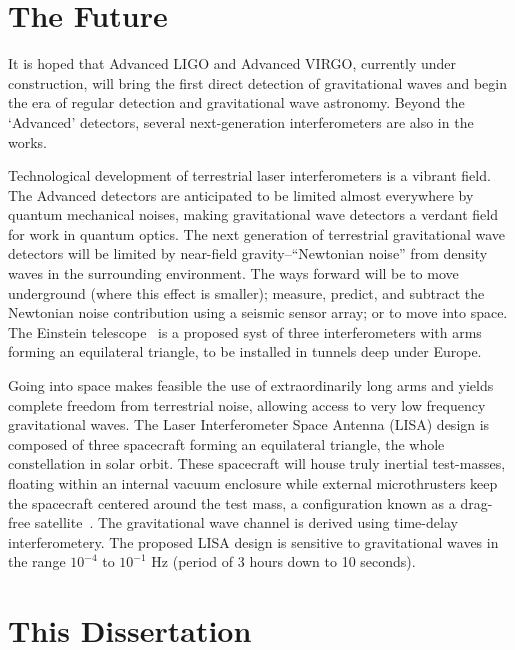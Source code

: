 \section{The Future}

It is hoped that Advanced LIGO and Advanced VIRGO, currently under
construction, will bring the first direct detection of gravitational
waves and begin the era of regular detection and gravitational wave
astronomy.
%
Beyond the `Advanced' detectors, several next-generation
interferometers are also in the works.

Technological development of terrestrial laser
interferometers is a vibrant field.  The Advanced detectors are
anticipated to be limited almost everywhere by quantum mechanical
noises, making gravitational wave detectors a verdant field for work
in quantum optics.  The next generation of terrestrial gravitational
wave detectors will be limited by near-field gravity--``Newtonian
noise'' from density waves in the surrounding environment.  The ways
forward will be to move underground (where this effect is smaller);
measure, predict, and subtract the Newtonian noise contribution using
a seismic sensor array; or to move into space.
%
The Einstein telescope~\cite{EinsteinTelescopeDesignStudy2011} is a
proposed syst of three interferometers with arms forming an
equilateral triangle, to be installed in tunnels deep under Europe.

Going into space makes feasible the use of extraordinarily long arms
and yields complete freedom from terrestrial noise, allowing access to
very low frequency gravitational waves.  The Laser Interferometer
Space Antenna (LISA) design is composed of three spacecraft forming an
equilateral triangle, the whole constellation in solar orbit.  These
spacecraft will house truly inertial test-masses, floating within an
internal vacuum enclosure while external microthrusters keep the
spacecraft centered around the test mass, a configuration known as a drag-free satellite~\cite{Lange1964DragFree}.  The gravitational wave
channel is derived using time-delay interferometery.  The proposed
LISA design is sensitive to gravitational waves in the range $10^{-4}$
to $10^{-1}$ Hz (period of 3 hours down to 10 seconds).

\section{This Dissertation}

